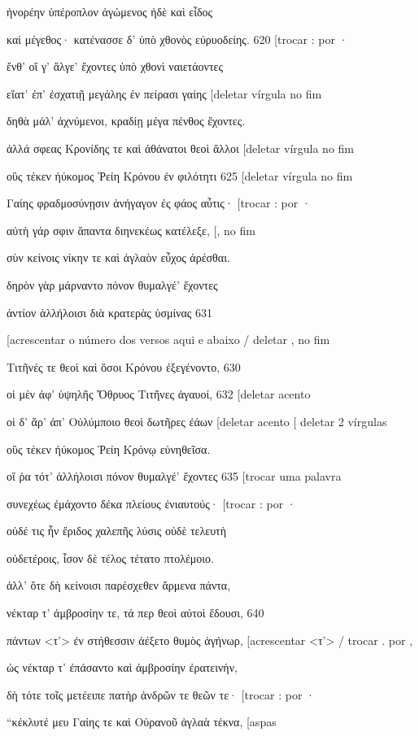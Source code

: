 ἠνορέην ὑπέροπλον ἀγώμενος ἠδὲ καὶ εἶδος

καὶ μέγεθος· κατένασσε δ' ὑπὸ χθονὸς εὐρυοδείης. 620 {[}trocar : por ·

ἔνθ' οἵ γ' ἄλγε' ἔχοντες ὑπὸ χθονὶ ναιετάοντες

εἵατ' ἐπ' ἐσχατιῇ μεγάλης ἐν πείρασι γαίης {[}deletar vírgula no fim

δηθὰ μάλ' ἀχνύμενοι, κραδίῃ μέγα πένθος ἔχοντες.

ἀλλά σφεας Κρονίδης τε καὶ ἀθάνατοι θεοὶ ἄλλοι {[}deletar vírgula no fim

οὓς τέκεν ἠύκομος Ῥείη Κρόνου ἐν φιλότητι 625 {[}deletar vírgula no fim

Γαίης φραδμοσύνῃσιν ἀνήγαγον ἐς φάος αὖτις· {[}trocar : por ·

αὐτὴ γάρ σφιν ἅπαντα διηνεκέως κατέλεξε, {[}, no fim

σὺν κείνοις νίκην τε καὶ ἀγλαὸν εὖχος ἀρέσθαι.

δηρὸν γὰρ μάρναντο πόνον θυμαλγέ' ἔχοντες

ἀντίον ἀλλήλοισι διὰ κρατερὰς ὑσμίνας 631

{[}acrescentar o número dos versos aqui e abaixo / deletar , no fim

Τιτῆνές τε θεοὶ καὶ ὅσοι Κρόνου ἐξεγένοντο, 630

οἱ μὲν ἀφ' ὑψηλῆς Ὄθρυος Τιτῆνες ἀγαυοί, 632 {[}deletar acento

οἱ δ' ἄρ' ἀπ' Οὐλύμποιο θεοὶ δωτῆρες ἐάων {[}deletar acento {[} deletar
2 vírgulas

οὓς τέκεν ἠύκομος Ῥείη Κρόνῳ εὐνηθεῖσα.

οἵ ῥα τότ' ἀλλήλοισι πόνον θυμαλγέ' ἔχοντες 635 {[}trocar uma palavra

συνεχέως ἐμάχοντο δέκα πλείους ἐνιαυτούς· {[}trocar : por ·

οὐδέ τις ἦν ἔριδος χαλεπῆς λύσις οὐδὲ τελευτὴ

οὐδετέροις, ἶσον δὲ τέλος τέτατο πτολέμοιο.

ἀλλ' ὅτε δὴ κείνοισι παρέσχεθεν ἄρμενα πάντα,

νέκταρ τ' ἀμβροσίην τε, τά περ θεοὶ αὐτοὶ ἔδουσι, 640

πάντων \textless{}τ'\textgreater{} ἐν στήθεσσιν ἀέξετο θυμὸς ἀγήνωρ,
{[}acrescentar \textless{}τ'\textgreater{} / trocar . por ,

ὡς νέκταρ τ' ἐπάσαντο καὶ ἀμβροσίην ἐρατεινήν,

δὴ τότε τοῖς μετέειπε πατὴρ ἀνδρῶν τε θεῶν τε· {[}trocar : por ·

``κέκλυτέ μευ Γαίης τε καὶ Οὐρανοῦ ἀγλαὰ τέκνα, {[}aspas

